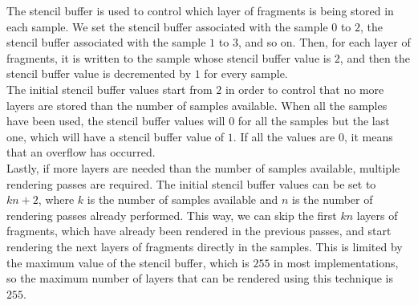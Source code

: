 The stencil buffer is used to control which layer of fragments is being stored in each sample. We set the stencil buffer associated with the sample $0$ to $2$, the stencil buffer associated with the sample $1$ to $3$, and so on. Then, for each layer of fragments, it is written to the sample whose stencil buffer value is $2$, and then the stencil buffer value is decremented by $1$ for every sample.\\

The initial stencil buffer values start from $2$ in order to control that no more layers are stored than the number of samples available. When all the samples have been used, the stencil buffer values will $0$ for all the samples but the last one, which will have a stencil buffer value of $1$. If all the values are $0$, it means that an overflow has occurred.\\

Lastly, if more layers are needed than the number of samples available, multiple rendering passes are required. The initial stencil buffer values can be set to $kn+2$, where $k$ is the number of samples available and $n$ is the number of rendering passes already performed. This way, we can skip the first $kn$ layers of fragments, which have already been rendered in the previous passes, and start rendering the next layers of fragments directly in the samples. This is limited by the maximum value of the stencil buffer, which is $255$ in most implementations, so the maximum number of layers that can be rendered using this technique is $255$.